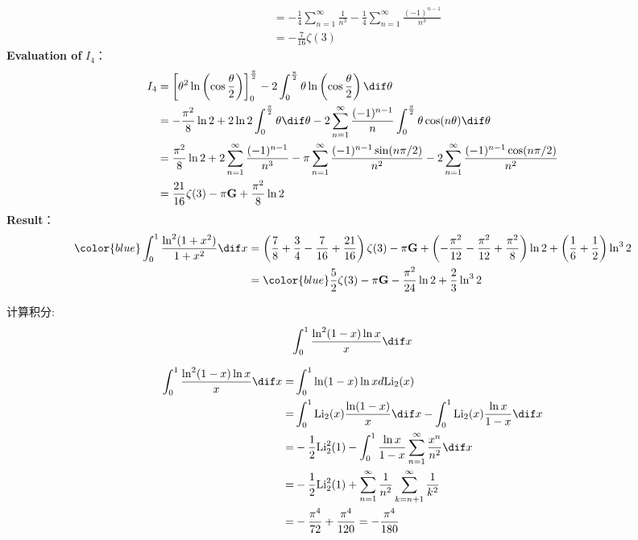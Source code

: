 \documentclass[color=green,titlestyle=hang]{elegantbook}%
\begin{document}
\begin{Solution}
\begin{align*}
&=-\frac{1}{4}\sum_{n=1}^{\infty}\frac{1}{n^3}-\frac{1}{4}\sum_{n=1}^{\infty}\frac{(-1)^{n-1}}{n^3}\\
&=-\frac{7}{16}\zeta(3)
\end{align*}
\textbf{Evaluation of} $I_4$：
\begin{align*}
I_4&=\left[\theta^2\ln\left(\cos\frac{\theta}{2}\right)\right]_0^{\frac{\pi}{2}}-2\int_0^{\frac{\pi}{2}}\theta\ln\left(\cos\frac{\theta}{2}\right)\dif\theta\\\
&=-\frac{\pi^2}{8}\ln2+2\ln2\int_0^{\frac{\pi}{2}}\theta\dif\theta-2\sum_{n=1}^{\infty}\frac{(-1)^{n-1}}{n}\int_0^{\frac{\pi}{2}}\theta\cos(n\theta)\dif\theta\\
&=\frac{\pi^2}{8}\ln2+2\sum_{n=1}^{\infty}\frac{(-1)^{n-1}}{n^3}-\pi\sum_{n=1}^{\infty}\frac{(-1)^{n-1}\sin(n\pi/2)}{n^2}-2\sum_{n=1}^{\infty}\frac{(-1)^{n-1}\cos(n\pi/2)}{n^2}\\
&=\frac{21}{16}\zeta(3)-\pi\mathrm{\mathbf{G}}+\frac{\pi^2}{8}\ln2
\end{align*}
\textbf{Result}：
\begin{align*}
\color{blue}\int_0^1\frac{\ln^2(1+x^2)}{1+x^2}\dif x
&=\left(\frac{7}{8}+\frac{3}{4}-\frac{7}{16}+\frac{21}{16}\right)\zeta(3)-\pi\mathrm{\mathbf{G}}+\left(-\frac{\pi^2}{12}-\frac{\pi^2}{12}+\frac{\pi^2}{8}\right)\ln2+\left(\frac{1}{6}+\frac{1}{2}\right)\ln^32\\
&=\color{blue}\frac{5}{2}\zeta(3)-\pi\mathrm{\mathbf{G}}-\frac{\pi^2}{24}\ln2+\frac{2}{3}\ln^32
\end{align*}
\end{Solution}

\begin{exercise}
计算积分:\[\int_{0}^{1}\frac{\ln^2(1-x)\ln x}{x}\dif x\]
\end{exercise}\begin{solution}
\begin{equation*}\begin{aligned}
\int_{0}^{1}\frac{\ln^2(1-x)\ln x}{x}\dif x=&\int_{0}^{1}\ln(1-x)\ln xd\textrm{Li}_2(x)\\
=&\int_{0}^{1}\textrm{Li}_2(x)\frac{\ln(1-x)}{x}\dif x-\int_{0}^{1}\textrm{Li}_2(x)\frac{\ln x}{1-x}\dif x\\
=&-\frac{1}{2}\textrm{Li}_{2}^{2}(1)-\int_{0}^{1}\frac{\ln x}{1-x}\sum_{n=1}^{\infty}\frac{x^n}{n^2}\dif x\\
=&-\frac{1}{2}\textrm{Li}_{2}^{2}(1)+\sum_{n=1}^{\infty}\frac{1}{n^2}\sum_{k=n+1}^{\infty}\frac{1}{k^2}\\
=&-\frac{{\pi}^4}{72}+\frac{{\pi}^4}{120}=-\frac{{\pi}^4}{180}
\end{aligned}\end{equation*}
\end{solution}
\end{document}
